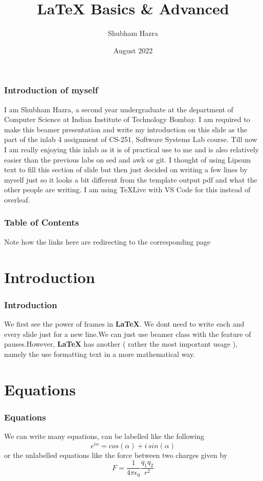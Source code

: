 \documentclass{beamer}
\title[\LaTeX{} Basics \& Advanced] 
{\LaTeX{} Basics \& Advanced}
\author[Shubham Hazra] 
{Shubham Hazra}
\institute[IITB] 
{
  IIT Bombay
}
\date[2022]
{August 2022}
\begin{document}
\frame{\titlepage}
\begin{frame}
    \frametitle{Introduction of myself}
    I am Shubham Hazra, a second year undergraduate at the department of Computer Science
    at Indian Institute of Technology Bombay. I am required to make this beamer
    presentation and write my introduction on this slide as the part of the inlab 4 
    assignment of CS-251, Software Systems Lab course. Till now I am really enjoying
    this inlab as it is of practical use to me and is also relatively easier than the
    previous labs on sed and awk or git. I thought of using Lipsum text to fill this 
    section of slide but then just decided on writing a few lines by myself just so
    it looks a bit different from the template output pdf and what the other 
    people are writing. I am using TeXLive with VS Code for this instead of overleaf.
\end{frame}

\begin{frame}
    \frametitle{Table of Contents}
    \tableofcontents
    Note how the links here are redirecting to the corresponding page
\end{frame}

\section[Introduction]{Introduction}
\begin{frame}
    \frametitle{Introduction}
    We first see the power of frames in \textbf{\LaTeX}. We dont need to write each
    and every slide just for a new line.\pause We can just use beamer class with the
    feature of pauses.\pause However, \textbf{\LaTeX} has another ( rather the most important
    usage ), namely the use \alert{formatting text} in a more mathematical way.
\end{frame}

\section[Equations]{Equations}
\begin{frame}
    \frametitle{Equations}
    We can write many equations, can be labelled like the following
    \begin{equation}
        e^{i\alpha} = cos(\alpha) + i\,sin(\alpha)
    \end{equation}\pause
    or the unlabelled equations like the force between two charges given by
    \begin{equation*}
        F = \frac{1}{4\pi\epsilon_0}\frac{q_1q_2}{r^2}
    \end{equation*}
\end{frame}
\end{document}
